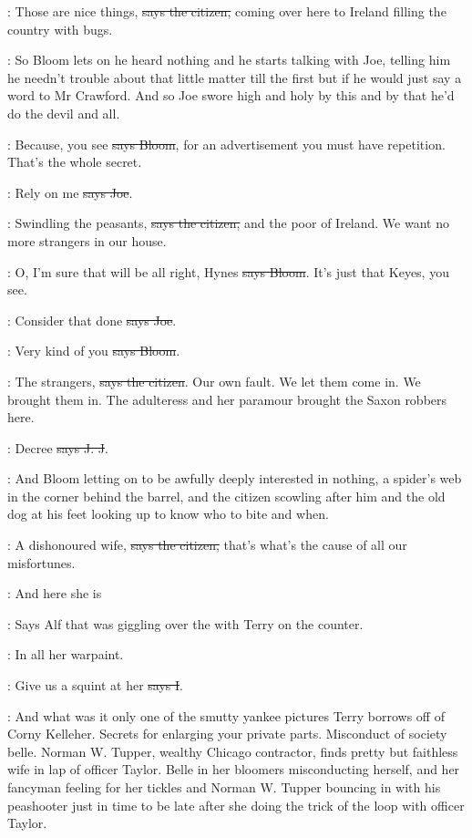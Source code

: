 \citizen:
Those are nice things, \sout{says the citizen,}
coming over here to Ireland filling the country with bugs.

\Nq:
So Bloom lets on he heard nothing and he starts talking with Joe, telling
him he needn't trouble about that little matter till the first but if he
would just say a word to Mr Crawford. And so Joe swore high and holy by
this and by that he'd do the devil and all.

\Bloom:
Because, you see \sout{says Bloom},
for an advertisement you must have
repetition. That's the whole secret.

\joe:
Rely on me \sout{says Joe}.

\citizen:
Swindling the peasants, \sout{says the citizen,}
and the poor of Ireland. We
want no more strangers in our house.

\Bloom:
O, I'm sure that will be all right,
Hynes \sout{says Bloom}. It's just that
Keyes, you see.

\joe:
Consider that done \sout{says Joe}.

\Bloom:
Very kind of you \sout{says Bloom}.

\citizen:
The strangers, \sout{says the citizen}.
Our own fault. We let them come in. We
brought them in. The adulteress and her paramour brought the Saxon
robbers here.

\jjom:
Decree  \sout{says J. J}.

\Nq:
And Bloom letting on to be awfully deeply interested in nothing, a
spider's web in the corner behind the barrel, and the citizen scowling
after him and the old dog at his feet looking up to know who to bite and
when.

\citizen:
A dishonoured wife, \sout{says the citizen,}
that's what's the cause of all our
misfortunes.

\bergan:
And here she is

\Nq:
Says Alf that was giggling over the 
with Terry on the counter.

\bergan:
In all her warpaint.

:
Give us a squint at her \sout{says I}.

\Nq:
And what was it only one of the smutty yankee pictures Terry
borrows off of Corny Kelleher. Secrets for enlarging your private parts.
Misconduct of society belle. Norman W. Tupper, wealthy Chicago
contractor, finds pretty but faithless wife in lap of officer Taylor.
Belle in her bloomers misconducting herself, and her fancyman feeling for
her tickles and Norman W. Tupper bouncing in with his peashooter just in
time to be late after she doing the trick of the loop with officer Taylor.

